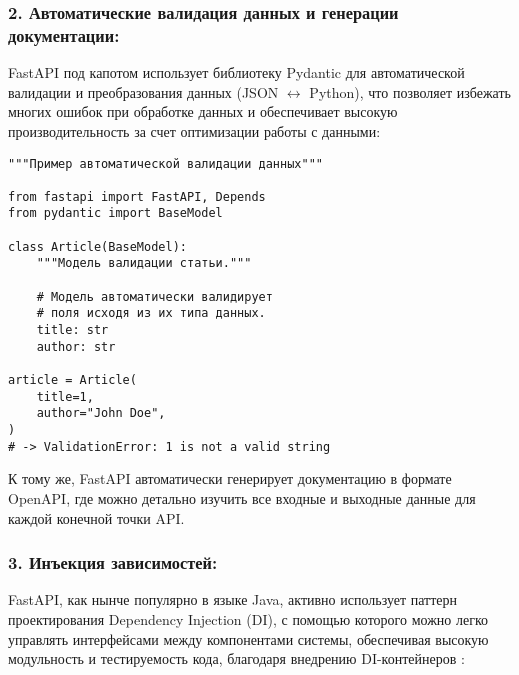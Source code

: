 \subsubsection*{2. Автоматические валидация данных и генерации документации:}
FastAPI под капотом использует библиотеку Pydantic для автоматической валидации 
и преобразования данных (JSON $\leftrightarrow$ Python), что позволяет избежать многих ошибок
при обработке данных и обеспечивает высокую производительность за счет оптимизации 
работы с данными:

\begin{verbatim}
"""Пример автоматической валидации данных"""

from fastapi import FastAPI, Depends
from pydantic import BaseModel

class Article(BaseModel):
    """Модель валидации статьи."""

    # Модель автоматически валидирует
    # поля исходя из их типа данных.
    title: str
    author: str

article = Article(
    title=1,
    author="John Doe",
)
# -> ValidationError: 1 is not a valid string
\end{verbatim}

К тому же, FastAPI автоматически генерирует документацию в формате OpenAPI,
где можно детально изучить все входные и выходные данные для каждой конечной точки API.

\subsubsection*{3. Инъекция зависимостей:}
FastAPI, как нынче популярно в языке Java, активно использует паттерн проектирования Dependency Injection (DI),
с помощью которого можно легко управлять интерфейсами между компонентами системы, обеспечивая высокую модульность 
и тестируемость кода, благодаря внедрению DI-контейнеров \cite{solid-principles-article,fastapi-bill, business-laguna}:

